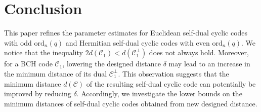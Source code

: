 \documentclass[10pt,a4paper]{amsart}
\begin{document}
\section{Conclusion}
\label{5}
This paper refines the parameter estimates for Euclidean self-dual cyclic codes with odd $\mathrm{ord}_n(q)$ and Hermitian self-dual cyclic codes with even $\mathrm{ord}_n(q)$. We notice that the inequality $2d(\mathcal{C}_1) < d(\mathcal{C}_1^\perp)$ does not always hold. Moreover, for a BCH code $\mathcal{C}_1$, lowering the designed distance $\delta$ may lead to an increase in the minimum distance of its dual $\mathcal{C}_1^\perp$. This observation suggests that the minimum distance $d(\mathcal{C})$ of the resulting self-dual cyclic code can potentially be improved by reducing $\delta$. Accordingly, we investigate the lower bounds on the minimum distances of self-dual cyclic codes obtained from new designed distance.
\end{document}
